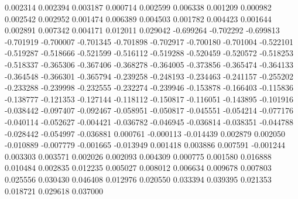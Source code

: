 0.002314
0.002394
0.003187
0.000714
0.002599
0.006338
0.001209
0.000982
0.002542
0.002952
0.001474
0.006389
0.004503
0.001782
0.004423
0.001644
0.002891
0.007342
0.004171
0.012011
0.029042
-0.699264
-0.702292
-0.699813
-0.701919
-0.700007
-0.701345
-0.701898
-0.702917
-0.700180
-0.701004
-0.522101
-0.519287
-0.518666
-0.521599
-0.516112
-0.519288
-0.520459
-0.520572
-0.518253
-0.518337
-0.365306
-0.367406
-0.368278
-0.364005
-0.373856
-0.365474
-0.364133
-0.364548
-0.366301
-0.365794
-0.239258
-0.248193
-0.234463
-0.241157
-0.255202
-0.233288
-0.239998
-0.232555
-0.232274
-0.239946
-0.153878
-0.166403
-0.115836
-0.138777
-0.121353
-0.127144
-0.118112
-0.150817
-0.116051
-0.143895
-0.101916
-0.038442
-0.097407
-0.092467
-0.058951
-0.050817
-0.045551
-0.054214
-0.077176
-0.040114
-0.052627
-0.004421
-0.036782
-0.046945
-0.036814
-0.038351
-0.044788
-0.028442
-0.054997
-0.036881
0.000761
-0.000113
-0.014439
0.002879
0.002050
-0.010889
-0.007779
-0.001665
-0.013949
0.001418
0.003886
0.007591
-0.001244
0.003303
0.003571
0.002026
0.002093
0.004309
0.000775
0.001580
0.016888
0.010484
0.002835
0.012235
0.005027
0.008012
0.006634
0.009678
0.007803
0.025556
0.030430
0.046408
0.012976
0.020550
0.033394
0.039395
0.021353
0.018721
0.029618
0.037000
